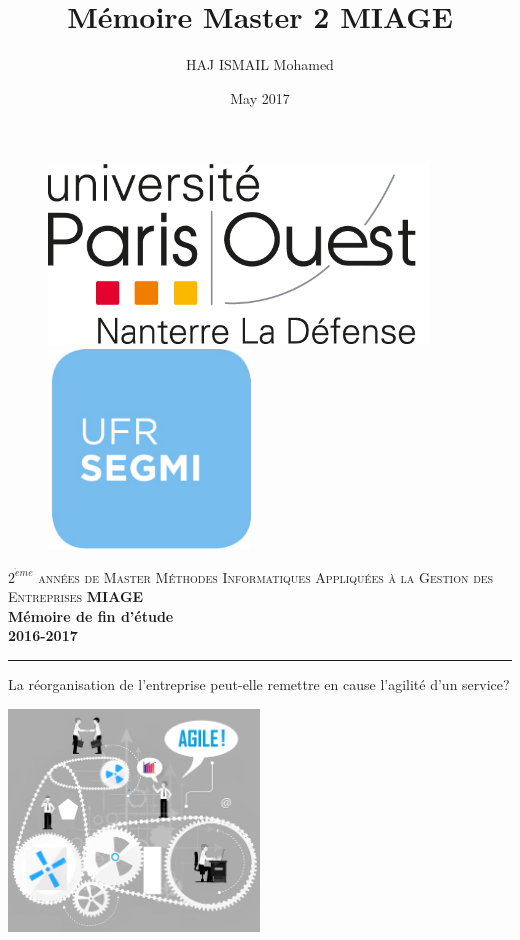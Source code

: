 \documentclass[12pt,a4paper]{article}
\title{Mémoire Master 2 MIAGE}
\author{HAJ ISMAIL Mohamed}
\date{May 2017}
\begin{document}
\begin{titlepage}
\begin{figure}[h]
    \begin{minipage}[c]{.16\linewidth}
        \centering
        \includegraphics{logouniv}
    \end{minipage}
    \hfill%
    \begin{minipage}[c]{.16\linewidth}
        \centering
        \includegraphics{segmi}
    \end{minipage}
\end{figure}
\begin{center}
\textsc{\Large $2^{\grave{e}me}$ années de Master Méthodes Informatiques Appliquées à la Gestion des Entreprises \textbf{MIAGE} }\\[0.5cm]

{ \huge \bfseries Mémoire de fin d'étude \\ 2016-2017   \\[0.4cm] }

\noindent\rule{12cm}{0.4pt}

\vspace{0.5cm}

\Large {La réorganisation de l'entreprise peut-elle remettre en cause l'agilité d'un service?} 

\vspace{0.3cm}

\includegraphics[width=0.5\textwidth]{agile.jpg}~\\[1cm]


\end{center}
\end{titlepage}
\end{document}

